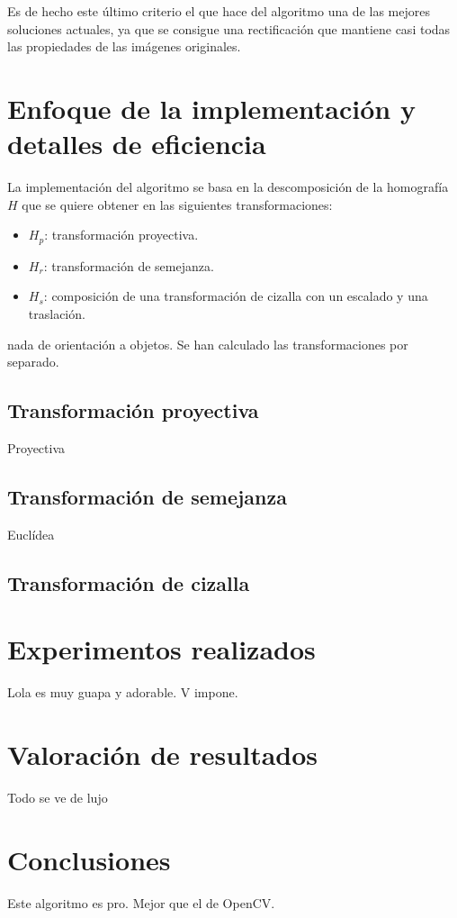 \documentclass[a4paper, 11pt]{article}
\theoremstyle{definition}
\begin{document}
    Es de hecho este último criterio el que hace del algoritmo una de las mejores soluciones actuales, ya que se consigue una rectificación que mantiene casi todas las propiedades de las imágenes originales.


    \section{Enfoque de la implementación y detalles de eficiencia}

    La implementación del algoritmo se basa en la descomposición de la homografía $H$ que se quiere obtener en las siguientes transformaciones:
    \begin{itemize}
        \item $H_p$: transformación proyectiva.
        \item $H_r$: transformación de semejanza.
        \item $H_s$: composición de una transformación de cizalla con un escalado y una traslación.
    \end{itemize}



     nada de orientación
      a objetos. Se han calculado las transformaciones por separado.

      \subsection{Transformación proyectiva}
      Proyectiva

      \subsection{Transformación de semejanza}
      Euclídea

      \subsection{Transformación de cizalla}

    \section{Experimentos realizados}

      Lola es muy guapa y adorable. V impone.

    \section{Valoración de resultados}

      Todo se ve de lujo

    \section{Conclusiones}

      Este algoritmo es pro. Mejor que el de OpenCV.
\end{document}
